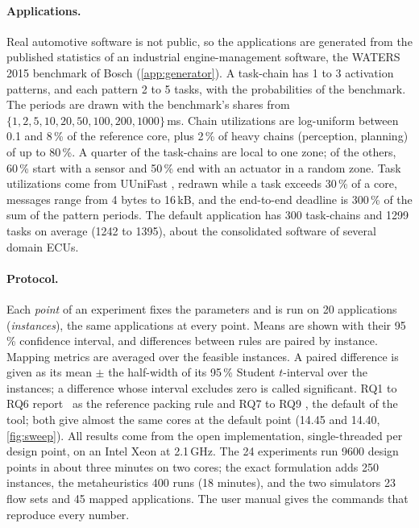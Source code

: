 \paragraph{Applications.} Real automotive software is not public, so the
applications are generated from the published statistics of an industrial
engine-management software, the WATERS 2015 benchmark of Bosch
\cite{kramer2015waters} (\cref{app:generator}). A task-chain has 1 to 3
activation patterns, and each pattern 2 to 5 tasks, with the probabilities
of the benchmark. The periods are drawn with the benchmark's shares from
$\{1,2,5,10,20,50,100,200,1000\}$\,ms. Chain utilizations are log-uniform
between 0.1 and 8\,\% of the reference core, plus 2\,\% of heavy chains
(perception, planning) of up to 80\,\%. A quarter of the task-chains are
local to one zone; of the others, 60\,\% start with a sensor and 50\,\% end
with an actuator in a random zone. Task utilizations come from
UUniFast \cite{bini2005measuring}, redrawn while a task exceeds 30\,\% of
a core, messages range from 4 bytes to
16\,kB, and the end-to-end deadline is 300\,\% of the sum of the pattern
periods. The default application has 300 task-chains and 1299 tasks on
average (1242 to 1395), about the consolidated software of several domain
ECUs.

\paragraph{Protocol.} Each \emph{point} of an experiment fixes the
parameters and is run on 20 applications (\emph{instances}), the same
applications at every point. Means are shown with their 95\,\% confidence
interval, and differences between rules are paired by instance. Mapping
metrics are averaged over the feasible instances. A paired difference is
given as its mean $\pm$ the half-width of its 95\,\% Student
$t$-interval over the instances; a difference whose interval excludes
zero is called significant. RQ1 to RQ6 report \BFDU\ as the
reference packing rule and RQ7 to RQ9 \FFDU, the default of the tool;
both give almost the same cores at the default point (14.45 and 14.40,
\cref{fig:sweep}). All
results come from the open implementation,
single-threaded per design point, on an Intel Xeon at 2.1\,GHz. The 24
experiments run 9600 design points in about three minutes on two cores;
the exact formulation adds 250 instances, the metaheuristics 400 runs
(18 minutes), and the two simulators 23 flow sets and 45 mapped
applications. The user manual gives the commands that reproduce every
number.

